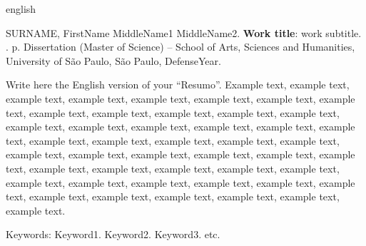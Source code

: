 \documentclass[
	12pt,				%
	oneside,			%
	a4paper,			%
	english,			%
	brazil				%
	]{abntex2ppgsi}
\begin{document}
% 
% 
\begin{resumo}[Abstract]
\begin{otherlanguage*}{english}

% 
%
%
%
\begin{flushleft}
SURNAME, FirstName MiddleName1 MiddleName2. \textbf{Work title}: work subtitle. \imprimirdata. \pageref{LastPage} p. Dissertation (Master of Science) – School of Arts, Sciences and Humanities, University of São Paulo, São Paulo, DefenseYear. 
\end{flushleft}

Write here the English version of your ``Resumo''. Example text, example text, example text, example text, example text, example text, example text, example text, example text, example text, example text, example text, example text, example text, example text, example text, example text, example text, example text, example text, example text, example text, example text, example text, example text, example text, example text, example text, example text, example text, example text, example text, example text, example text, example text, example text, example text, example text, example text, example text, example text, example text, example text, example text, example text, example text, example text.

Keywords: Keyword1. Keyword2. Keyword3. etc.
\end{otherlanguage*}
\end{resumo}

\listoffigures*
\cleardoublepage
\end{document}
